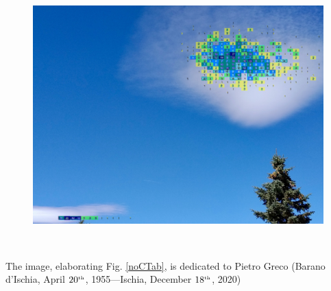 \documentclass[8pt]{beamer}
\begin{document}
\begin{frame}{}

\begin{figure}[H]
\center
\includegraphics[scale=0.09]{mappaEpidemieNelleNuvole.jpeg}
\end{figure}

\

The image, elaborating Fig. \ref{noCTab}, is dedicated to Pietro Greco (Barano d'Ischia, April $20^{\text{\tiny th}}$, 1955---Ischia, December $18^{\text{\tiny th}}$, 2020)
 
\end{frame}
\end{document}
